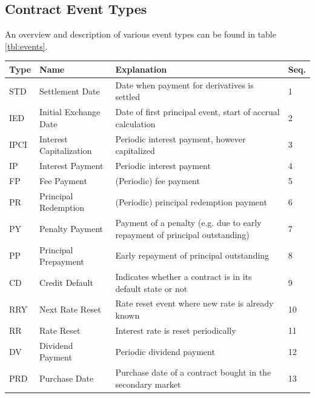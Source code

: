 \documentclass[9pt,oneside]{amsart}
\begin{document}
\begin{multicols}{2}





\section{Contract Event Types}\label{sec:events}

An overview and description of various event types can be found in table \ref{tbl:events}. 




\begin{table}[H]
	\begin{tabular}{| p{0.23in}p{0.7in}p{1.4in}p{0.2in} |}
	\hline
	\textbf{Type} & \textbf{Name} & \textbf{Explanation} & \textbf{Seq.} \\
	\hline
	STD & Settlement Date & Date when payment for derivatives is settled & 1 \\
	\hline
	IED & Initial Exchange Date & Date of first principal event, start of accrual calculation & 2 \\
	\hline
	IPCI & Interest Capitalization & Periodic interest payment, however capitalized & 3 \\
	\hline
	IP & Interest Payment & Periodic interest payment & 4 \\
	\hline
	FP & Fee Payment & (Periodic) fee payment & 5 \\
	\hline
	PR & Principal Redemption & (Periodic) principal redemption payment & 6 \\
	\hline
	PY & Penalty Payment & Payment of a penalty (e.g. due to early repayment of principal outstanding) & 7 \\
	\hline
	PP & Principal Prepayment & Early repayment of principal outstanding & 8 \\
	\hline
	CD & Credit Default & Indicates whether a contract is in its default state or not & 9 \\
	\hline
	RRY & Next Rate Reset & Rate reset event where new rate is already known & 10 \\
	\hline
	RR & Rate Reset & Interest rate is reset periodically & 11 \\
	\hline
	DV & Dividend Payment & Periodic dividend payment & 12 \\
	\hline
	PRD & Purchase Date & Purchase date of a contract bought in the secondary market & 13 \\

\end{tabular}
\end{table}
\end{multicols}
\end{document}
